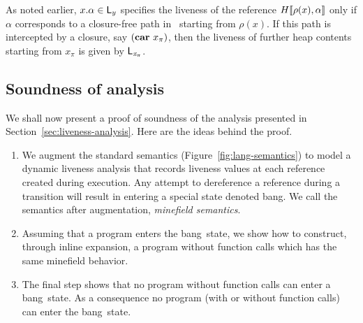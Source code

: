 \documentclass[9pt]{sigplanconf}
\newcommand{\mycomment}[1]{{\color{Myblue}{#1}} }
\newcommand{\bang}{\mbox{\sc bang}}
\begin{document}
As noted earlier,  $x.\alpha \in \mathsf{L}_y$ specifies the  liveness of the
reference $H\llbracket\rho(x), \alpha\rrbracket$  only if $\alpha$
corresponds to a closure-free path  in \heap\ starting from $\rho(x)$.
If this path is intercepted by a closure, say $(\mbox{$\mathbf{car}$}~{x_{\pi}})$, then
the liveness of further heap contents starting from $\mathit{x_{\pi}}$
is given by $\mathsf{L}_\mathit{x_{\pi}}$.



\subsection{Soundness of analysis}  

We shall now present a proof of soundness of the analysis presented in
Section~\ref{sec:liveness-analysis}.   Here are  the ideas  behind the
proof.
\begin{enumerate}
\item       We   augment     the        standard       semantics
  (Figure~\ref{fig:lang-semantics}) to model  a dynamic liveness analysis 
that records liveness values at each reference created during execution.
Any attempt to dereference a reference \mycomment{that has been declared not live by our analysis} %
 during  a  transition  will  result  in entering  a
  special state denoted \bang. We call the semantics after
  augmentation,  \emph{minefield semantics}.
\item \label{inline1} Assuming that a  program enters the \bang\ state,
  we  show  how to  construct,  through  inline expansion,  a  program
  without function calls which has the same minefield behavior.
\item  The final  step   shows  that  no program  without
  function calls can enter a \bang\ state. As a consequence no program
  (with or without function calls) can enter the \bang\ state. 
\end{enumerate}
\end{document}
